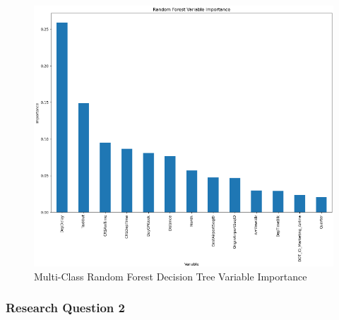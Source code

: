 \documentclass[a4paper,12pt]{article}
\begin{document}
\begin{figure}
    \centering
    \includegraphics*[scale=.50]{../../img/model_rq1_rf.png}
    \caption[]{Multi-Class Random Forest Decision Tree Variable Importance}
    \label{fig:model:rq1:rfc_1}
\end{figure}


\subsubsection{Research Question 2}
\end{document}
